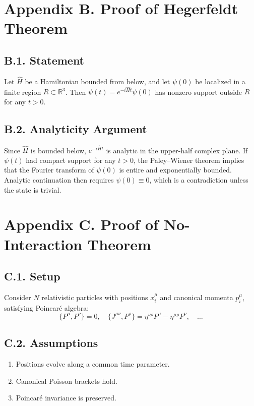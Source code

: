 \documentclass[12pt,oneside]{book}
\theoremstyle{plain}
\theoremstyle{definition}
\begin{document}
\section{Appendix B. Proof of Hegerfeldt Theorem}

\subsection*{B.1. Statement}

Let $\widehat{H}$ be a Hamiltonian bounded from below, and let $\psi(0)$ be localized in a finite region $R \subset \mathbb{R}^3$. Then $\psi(t) = e^{-i \widehat{H} t}\psi(0)$ has nonzero support outside $R$ for any $t>0$.

\subsection*{B.2. Analyticity Argument}

Since $\widehat{H}$ is bounded below, $e^{-i\widehat{H}t}$ is analytic in the upper-half complex plane. If $\psi(t)$ had compact support for any $t>0$, the Paley–Wiener theorem implies that the Fourier transform of $\psi(0)$ is entire and exponentially bounded. Analytic continuation then requires $\psi(0) \equiv 0$, which is a contradiction unless the state is trivial.

\section{Appendix C. Proof of No-Interaction Theorem}

\subsection*{C.1. Setup}

Consider $N$ relativistic particles with positions $x_i^\mu$ and canonical momenta $p_i^\mu$, satisfying Poincaré algebra:
\[
\{P^\mu, P^\nu\} = 0, \quad \{J^{\mu\nu}, P^\rho\} = \eta^{\nu\rho} P^\mu - \eta^{\mu\rho} P^\nu, \quad \dots
\]

\subsection*{C.2. Assumptions}

\begin{enumerate}
    \item Positions evolve along a common time parameter.
    \item Canonical Poisson brackets hold.
    \item Poincaré invariance is preserved.
\end{enumerate}
\end{document}
